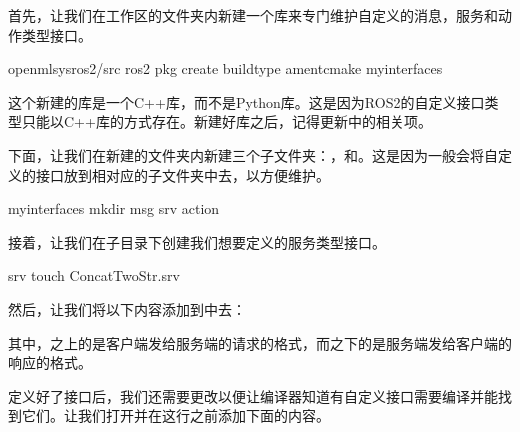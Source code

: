 \documentclass[letterpaper,10pt,english]{sphinxmanual}
\begin{document}
\sphinxAtStartPar
首先，让我们在工作区的文件夹内新建一个库来专门维护自定义的消息，服务和动作类型接口。

\begin{sphinxVerbatim}[commandchars=\\\{\}]
 openmlsys\PYGZhy{}ros2/src
ros2 pkg create \PYGZhy{}\PYGZhy{}build\PYGZhy{}type ament\PYGZus{}cmake my\PYGZus{}interfaces
\end{sphinxVerbatim}

\sphinxAtStartPar
这个新建的库是一个C++库，而不是Python库。这是因为ROS2的自定义接口类型只能以C++库的方式存在。新建好库之后，记得更新中的相关项。

\sphinxAtStartPar
下面，让我们在新建的文件夹内新建三个子文件夹：，和。这是因为一般会将自定义的接口放到相对应的子文件夹中去，以方便维护。

\begin{sphinxVerbatim}[commandchars=\\\{\}]
 my\PYGZus{}interfaces
mkdir msg srv action
\end{sphinxVerbatim}

\sphinxAtStartPar
接着，让我们在子目录下创建我们想要定义的服务类型接口。

\begin{sphinxVerbatim}[commandchars=\\\{\}]
 srv
touch ConcatTwoStr.srv
\end{sphinxVerbatim}

\sphinxAtStartPar
然后，让我们将以下内容添加到中去：

\begin{sphinxVerbatim}[commandchars=\\\{\}]
 
 
 
\end{sphinxVerbatim}

\sphinxAtStartPar
其中，\sphinxcode{\sphinxupquote{\sphinxhyphen{}\sphinxhyphen{}\sphinxhyphen{}}}之上的是客户端发给服务端的请求的格式，而之下的是服务端发给客户端的响应的格式。

\sphinxAtStartPar
定义好了接口后，我们还需要更改以便让编译器知道有自定义接口需要编译并能找到它们。让我们打开并在这行之前添加下面的内容。
\end{document}
